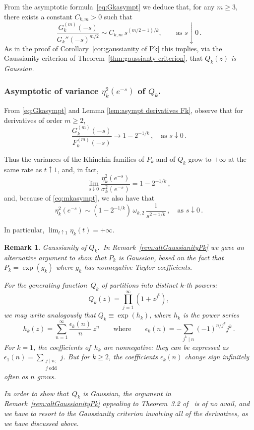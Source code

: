 \documentclass[12pt]{amsart}
\newtheorem{remark}{Remark}[section]
\theoremstyle{definition}
\begin{document}
From the asymptotic formula~\eqref{eq:Gkasympt} we deduce that, for any $m\ge 3$, there exists a
constant $C_{k,m}>0$ such that
\[
\frac{G_k^{(m)}(-s)}{G_k''(-s)^{m/2}} \sim C_{k,m}\, s^{(m/2-1)/k}, \qquad \text{as } s\downarrow 0\,.
\]
As in the proof of Corollary~\ref{cor:gaussianity of Pk} this implies, via the Gaussianity criterion of Theorem~\ref{thm:gaussianty criterion},
that \emph{$Q_k(z)$ is Gaussian.}

\subsubsection{Asymptotic of variance $\eta_k^2(e^{-s})$ of $Q_k$.}\label{seccion:comparability of variances}

From \eqref{eq:Gkasympt} and Lemma \ref{lem:asympt derivatives Fk}, observe that for derivatives of order $m \ge 2$,
\begin{equation}\label{eq:derivativesPkQk}
\frac{G_k^{(m)}(-s)}{F_k^{(m)}(-s)}\to 1-{2^{-1/k}}\, , \quad \mbox{as $s \downarrow 0$}\,.
\end{equation}

Thus the variances of the Khinchin families of $P_k$ and of $Q_k$ grow to $+\infty$ at the same rate as $t \uparrow 1$, and, in fact,
$$\lim_{s \downarrow 0} \frac{\eta^2_k(e^{-s})}{\sigma^2_k(e^{-s})}=1-{2^{-1/k}}\,,$$
and, because of \eqref{eq:mkasympt}, we also have that
\begin{equation}\label{eq:asymptotic of etak}\eta^2_k(e^{-s})\sim (1-{2^{-1/k}}) \, \omega_{k,2}\,\frac{1}{s^{2+1/k}}\, , \quad \mbox{as $s \downarrow 0$}\,.\end{equation}

In particular, $\lim_{t\uparrow 1} \eta_k(t)=+\infty$.


\begin{remark}\textit{Gaussianity of $Q_k$.}\rm \, In Remark~\ref{rem:altGaussianityPk} we gave an alternative argument to show that $P_k$ is Gaussian, based on the fact that $P_k=\exp(g_k)$ where $g_k$ has nonnegative Taylor coefficients.

For the generating function~$Q_k$ of partitions into distinct $k$-th powers:
\[
Q_k(z) = \prod_{j=1}^{\infty} (1+z^{j^k}),
\]
we may write analogously that $Q_k \equiv \exp(h_k)$, where $h_k$ is the power series
\[
h_k(z) = \sum_{n=1}^{\infty} \frac{\epsilon_k(n)}{n}\, z^n \qquad \text{where} \qquad \epsilon_k(n) = -\sum_{j^k\mid n} (-1)^{n/j^k} j^k\,.
\]
For $k=1$, the coefficients of~$h_k$ are nonnegative: they can be expressed as $\epsilon_1(n) = \sum_{\substack{j\mid n;\\ j\;\text{odd}}} j$. But for $k\ge 2$, the coefficients $\epsilon_k(n)$ change sign infinitely often as $n$ grows.

\smallskip

In order to show that~$Q_k$ is Gaussian, the argument in Remark~\ref{rem:altGaussianityPk} appealing to Theorem~3.2 of~\cite{CFMK} is of no avail, and we have to resort to the Gaussianity criterion involving all of the
derivatives, as we have discussed above.


\end{remark}
\end{document}
